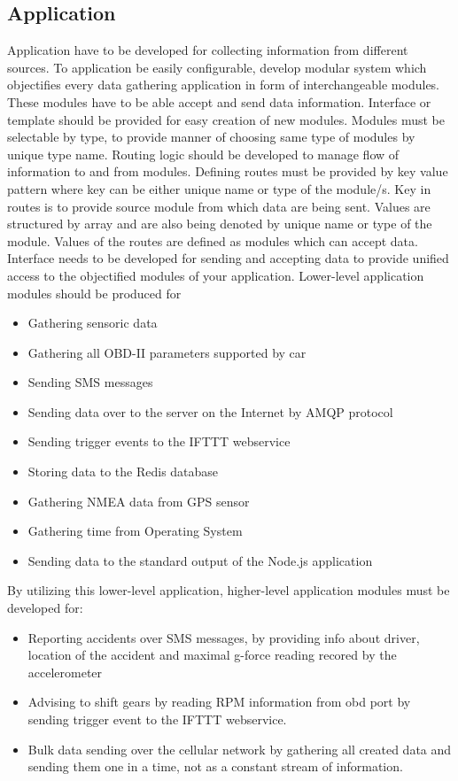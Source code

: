 \subsection{Application}
Application have to be developed for collecting information from different sources. To application be easily configurable, develop modular system which objectifies every data gathering application in form of interchangeable modules. These modules have to be able  accept and send data information. Interface or template should be provided for easy creation of new modules.  Modules must be selectable by type, to provide manner of choosing same type of modules by unique type name. Routing logic should be developed to manage flow of information to and from modules. Defining routes must be provided by key value pattern where key can be either unique name or type of the module/s. Key in routes is to provide source module from which data are being sent. Values are structured by array and are also being denoted by unique name or type of the module. Values of the routes are defined as modules which can accept data. Interface needs to be developed for sending and accepting data to provide unified access to the objectified modules of your application. Lower-level application modules should be produced for
\begin{itemize}
 	\item Gathering sensoric data
 	\item Gathering all OBD-II parameters supported by car
 	\item Sending SMS messages
 	\item Sending data over to the server on the Internet by AMQP protocol
 	\item Sending trigger events to the IFTTT webservice
 	\item Storing data to the Redis database
 	\item Gathering NMEA data from GPS sensor
 	\item Gathering time from Operating System
 	\item Sending data to the standard output of the Node.js application
 \end{itemize}
 By utilizing this lower-level application, higher-level application modules must be developed for:
\begin{itemize}
	\item Reporting accidents over SMS messages, by providing info about driver, location of the accident and maximal g-force reading recored by the accelerometer
	\item Advising to shift gears by reading RPM information from \gls{obd} port by sending trigger event to the IFTTT webservice.
	\item Bulk data sending over the cellular network by gathering all created data and sending them one in a time, not as a constant stream of information.
\end{itemize}

